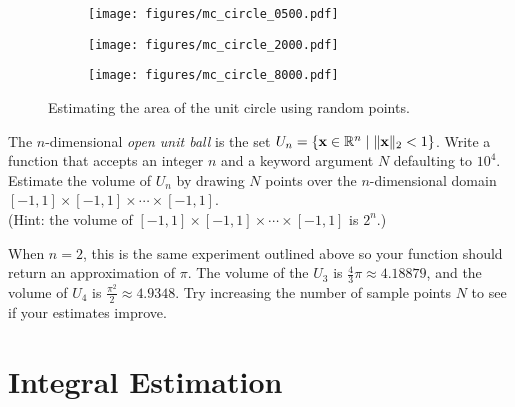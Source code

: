 \begin{figure}[H] %
\captionsetup[subfigure]{justification=centering}
\centering
\begin{subfigure}{.32\textwidth}
    \centering
    \texttt{[image: figures/mc\_circle\_0500.pdf]}
\end{subfigure}
%
\begin{subfigure}{.32\textwidth}
    \centering
    \texttt{[image: figures/mc\_circle\_2000.pdf]}
\end{subfigure}
%
\begin{subfigure}{.32\textwidth}
    \centering
    \texttt{[image: figures/mc\_circle\_8000.pdf]}
\end{subfigure}
\caption{Estimating the area of the unit circle using random points.}
\end{figure}

\begin{problem}
The $n$-dimensional \emph{open unit ball} is the set $U_n = \{\mathbf{x}\in\mathbb{R}^n\mid \|\mathbf{x}\|_2 < 1\}$.
Write a function that accepts an integer $n$ and a keyword argument $N$ defaulting to $10^4$.
Estimate the volume of $U_n$ by drawing $N$ points over the $n$-dimensional domain $[-1,1]\times[-1,1]\times\cdots\times[-1,1]$.
\\(Hint: the volume of $[-1,1]\times[-1,1]\times\cdots\times[-1,1]$ is $2^n$.)

When $n=2$, this is the same experiment outlined above so your function should return an approximation of $\pi$.
The volume of the $U_3$ is $\frac{4}{3}\pi \approx 4.18879$, and the volume of $U_4$ is $\frac{\pi^2}{2} \approx 4.9348$.
Try increasing the number of sample points $N$ to see if your estimates improve.
\label{prob:unit-ball-volume}
\end{problem}

\section*{Integral Estimation} %

